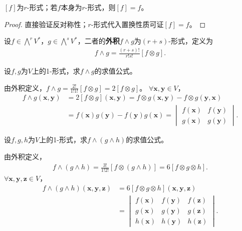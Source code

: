 \documentclass[../../main.tex]{subfiles}%
\begin{document}
\begin{proposition}
$[f]$为$r$-形式；若$f$本身为$r$-形式，则$[f]=f$。
\end{proposition}
\begin{proof}

直接验证反对称性；$r$-形式代入置换性质可证$[f]=f$。

\end{proof}

\begin{definition}
设$f\in\bigwedge^r V^*$，$g\in\bigwedge^s V^*$，二者的\textbf{外积}$f\wedge g$为$(r+s)$-形式，定义为
\begin{align}
f\wedge g=\frac{(r+s)!}{r!s!}[f\otimes g].
\label{eq:wedge_product}
\end{align}
\end{definition}

\begin{example}
设$f,g$为$V$上的1-形式，求$f\wedge g$的求值公式。
\end{example}
\begin{solution}

由外积定义，$f\wedge g=\frac{2!}{1!1!}[f\otimes g]=2[f\otimes g]$。
$\forall\boldsymbol{x},\boldsymbol{y}\in V$，
\begin{align*}
f\wedge g(\boldsymbol{x},\boldsymbol{y})&=2[f\otimes g](\boldsymbol{x},\boldsymbol{y})=f\otimes g(\boldsymbol{x},\boldsymbol{y})-f\otimes g(\boldsymbol{y},\boldsymbol{x})\\
&=f(\boldsymbol{x})g(\boldsymbol{y})-f(\boldsymbol{y})g(\boldsymbol{x})=
\begin{vmatrix}
f(\boldsymbol{x}) & f(\boldsymbol{y})\\
g(\boldsymbol{x}) & g(\boldsymbol{y})
\end{vmatrix}.
\end{align*}

\end{solution}

\begin{example}
设$f,g,h$为$V$上的1-形式，求$f\wedge(g\wedge h)$的求值公式。
\end{example}
\begin{solution}

由外积定义，
\begin{align*}
f\wedge(g\wedge h)=\frac{3!}{1!2!}[f\otimes(g\wedge h)]=6[f\otimes g\otimes h].
\end{align*}
$\forall\boldsymbol{x},\boldsymbol{y},\boldsymbol{z}\in V$，
\begin{align*}
f\wedge(g\wedge h)(\boldsymbol{x},\boldsymbol{y},\boldsymbol{z})&=6[f\otimes g\otimes h](\boldsymbol{x},\boldsymbol{y},\boldsymbol{z})\\
&=
\begin{vmatrix}
f(\boldsymbol{x}) & f(\boldsymbol{y}) & f(\boldsymbol{z})\\
g(\boldsymbol{x}) & g(\boldsymbol{y}) & g(\boldsymbol{z})\\
h(\boldsymbol{x}) & h(\boldsymbol{y}) & h(\boldsymbol{z})
\end{vmatrix}.
\end{align*}

\end{solution}
\end{document}
